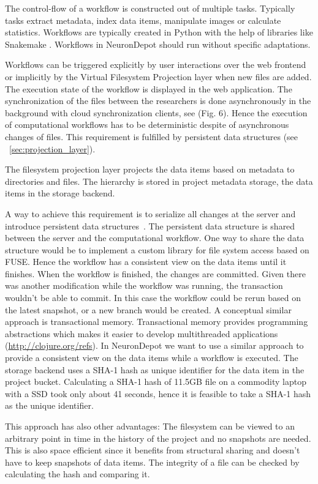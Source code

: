\documentclass{frontiersSCNS} %
\begin{document}
The control-flow of a workflow is constructed out of multiple tasks. Typically
tasks extract metadata, index data items, manipulate images or calculate
statistics. Workflows are typically created in Python with the help of
libraries like Snakemake \citep{Koester2012}. Workflows in NeuronDepot should run
without specific adaptations.

Workflows can be triggered explicitly by user interactions over the web
frontend or implicitly by the Virtual Filesystem Projection layer when new
files are added. The execution state of the workflow is displayed in the web
application. The synchronization of the files between the researchers is done
asynchronously in the background with cloud synchronization clients, see (Fig.
6). Hence the execution of computational workflows  has to be deterministic
despite of asynchronous changes of files. This requirement is fulfilled by
persistent data structures (see ~\ref{sec:projection_layer}).

The filesystem projection layer projects the data items based on metadata to
directories and files. The hierarchy is stored in project metadata storage, the
data items in the storage backend.

A way to achieve this requirement is to serialize all changes at the server and
introduce persistent data structures~\cite{Driscoll1989}. The persistent data
structure is shared between the server and the computational workflow. One way
to share the data structure would be to implement a custom library for file
system access based on FUSE. Hence the workflow has a consistent view on the
data items until it finishes. When the workflow is finished, the changes are
committed. Given there was another modification while the workflow was running,
the transaction wouldn’t be able to commit. In this case the workflow could be
rerun based on the latest snapshot, or a new branch would be created. A
conceptual similar approach is transactional memory. Transactional memory
provides programming abstractions which makes it easier to develop
multithreaded applications (\url{http://clojure.org/refs}). In NeuronDepot we
want to use a similar approach to provide a consistent view on the data items
while a workflow is executed. The storage backend uses a SHA-1 hash as unique
identifier for the data item in the project bucket. Calculating a SHA-1 hash of
11.5GB file on a commodity laptop with a SSD took only about 41 seconds, hence
it is feasible to take a SHA-1 hash as the unique identifier.

This approach has also other advantages: The filesystem can be viewed to an
arbitrary point in time in the history of the project and no snapshots are
needed. This is also space efficient since it benefits from structural sharing
and doesn't have to keep snapshots of data items. The integrity of a file can
be checked by calculating the hash and comparing it.
\end{document}

